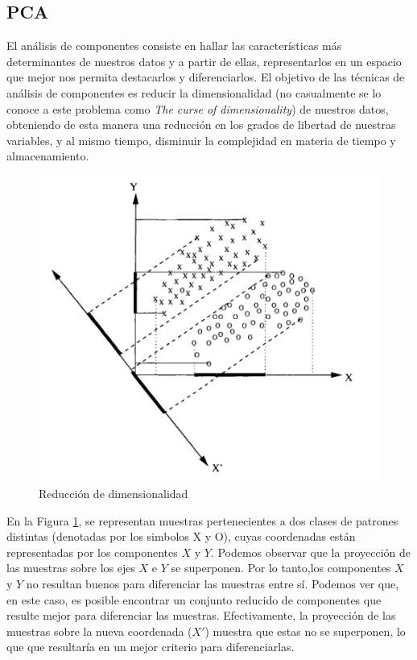 \documentclass[a4paper]{article}
\begin{document}
    \subsection{PCA}
    El análisis de componentes consiste en hallar las características más determinantes de nuestros datos y a partir de ellas, representarlos en un espacio que mejor nos permita destacarlos y diferenciarlos. El objetivo de las técnicas de análisis de componentes es reducir la dimensionalidad (no casualmente se lo conoce a este problema como \emph{The curse of dimensionality}) de nuestros datos, obteniendo de esta manera una reducción en los grados de libertad de nuestras variables, y al mismo tiempo, disminuir la complejidad en materia de tiempo y almacenamiento.

    \begin{figure}[H]
        \begin{center}
            \includegraphics[scale=0.5]{img/explicaciones/dim_reduct.png}
        \end{center}
        \caption{Reducción de dimensionalidad}
        \label{wwww}
    \end{figure}

    En la Figura \ref{wwww}, se representan muestras pertenecientes a dos clases de patrones distintas (denotadas por los simbolos X y O), cuyas coordenadas están representadas por los componentes $X$ y $Y$. Podemos observar que la proyección de las muestras sobre los ejes $X$ e $Y$ se superponen. Por lo tanto,los componentes $X$ y $Y$ no resultan buenos para diferenciar las muestras entre sí. Podemos ver que, en este caso, es posible encontrar un conjunto reducido de componentes que resulte mejor para diferenciar las muestras. Efectivamente, la proyección de las muestras sobre la nueva coordenada ($X'$) muestra que estas no se superponen, lo que que resultaría en un mejor criterio para diferenciarlas.
    
\end{document}
